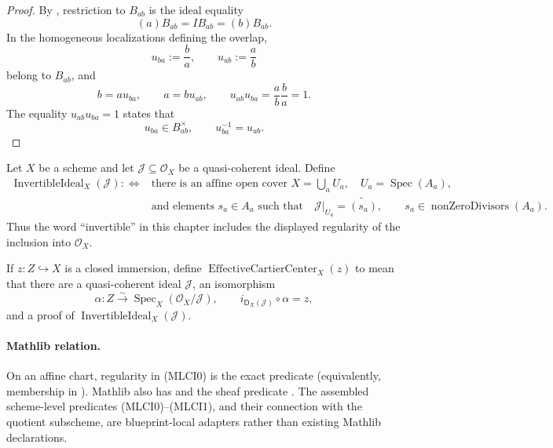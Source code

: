 \begin{proof}
  By , restriction to
  $B_{ab}$ is the ideal equality
  \[
    (a)B_{ab}=IB_{ab}=(b)B_{ab}.
  \]
  In the homogeneous localizations defining the overlap,
  \[
    u_{ba}:=\frac{b}{a},\qquad u_{ab}:=\frac{a}{b}
  \]
  belong to $B_{ab}$, and
  \[
    b=au_{ba},\qquad a=bu_{ab},\qquad
    u_{ab}u_{ba}=\frac ab\frac ba=1.
  \]
  The equality $u_{ab}u_{ba}=1$ states that
  \[
    u_{ba}\in B_{ab}^\times,
    \qquad u_{ba}^{-1}=u_{ab}.
  \]
\end{proof}

\begin{definition}
  \label{def:nagata-invertible-ideal-effective-cartier}
  \lean{}

  Let $X$ be a scheme and let
  $\mathcal J\subseteq\mathcal O_X$ be a quasi-coherent ideal.  Define
  \[
  \begin{aligned}
    \operatorname{InvertibleIdeal}_X(\mathcal J)
      :\Longleftrightarrow{}&
      \text{there is an affine open cover }X=\bigcup_aU_a,\quad
      U_a=\operatorname{Spec}(A_a),\\
      &\text{and elements }s_a\in A_a\text{ such that}\quad
      \mathcal J|_{U_a}=\widetilde{(s_a)},\qquad
      s_a\in\operatorname{nonZeroDivisors}(A_a).
  \end{aligned}                                                   \tag{MLCI0}
  \]
  Thus the word ``invertible'' in this chapter includes the displayed
  regularity of the inclusion into $\mathcal O_X$.

  If $z\colon Z\hookrightarrow X$ is a closed immersion, define
  \(\operatorname{EffectiveCartierCenter}_X(z)\) to mean that there are a
  quasi-coherent ideal $\mathcal J$, an isomorphism
  \[
    \alpha\colon
      Z\xrightarrow{\sim}
      \operatorname{Spec}_X(\mathcal O_X/\mathcal J),
    \qquad
    i_{\mathsf D_X(\mathcal J)}\circ\alpha=z,                    \tag{MLCI1}
  \]
  and a proof of
  $\operatorname{InvertibleIdeal}_X(\mathcal J)$.

  \paragraph{Mathlib relation.}
  On an affine chart, regularity in (MLCI0) is the exact predicate
  \texttt{} (equivalently, membership in
  \texttt{}).  Mathlib also has
  \texttt{} and the sheaf predicate
  \texttt{}.  The assembled
  scheme-level predicates (MLCI0)--(MLCI1), and their connection with the
  quotient subscheme, are blueprint-local adapters rather than existing
  Mathlib declarations.
\end{definition}

